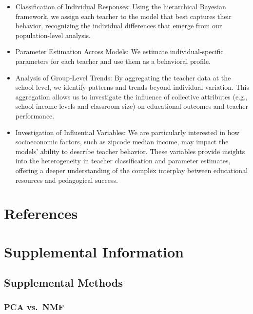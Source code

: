 \documentclass[
  number,
  preprint,
  3p,
  onecolumn]{elsarticle}
\begin{document}
\begin{itemize}
\item
  Classification of Individual Responses: Using the hierarchical
  Bayesian framework, we assign each teacher to the model that best
  captures their behavior, recognizing the individual differences that
  emerge from our population-level analysis.
\item
  Parameter Estimation Across Models: We estimate individual-specific
  parameters for each teacher and use them as a behavioral profile.
\item
  Analysis of Group-Level Trends: By aggregating the teacher data at the
  school level, we identify patterns and trends beyond individual
  variation. This aggregation allows us to investigate the influence of
  collective attributes (e.g., school income levels and classroom size)
  on educational outcomes and teacher performance.
\item
  Investigation of Influential Variables: We are particularly interested
  in how socioeconomic factors, such as zipcode median income, may
  impact the models' ability to describe teacher behavior. These
  variables provide insights into the heterogeneity in teacher
  classification and parameter estimates, offering a deeper
  understanding of the complex interplay between educational resources
  and pedagogical success.
\end{itemize}

\section{References}\label{references}

\renewcommand{\bibsection}{}


\newpage{}

\section{Supplemental Information}\label{supplemental-information}

\subsection{Supplemental Methods}\label{supplemental-methods}

\subsubsection{PCA vs.~NMF}\label{pca-vs.-nmf}
\end{document}
